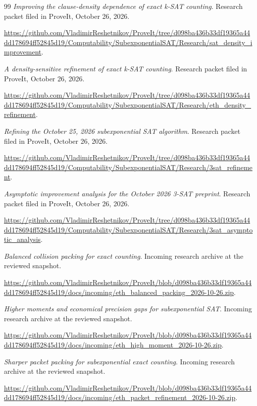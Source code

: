 \begin{thebibliography}{99}
 \emph{Improving the clause-density dependence of exact k-SAT counting}. Research packet filed in ProveIt, October 26, 2026.

\url{https://github.com/VladimirReshetnikov/ProveIt/tree/d098ba436b33df19365a44dd178694ff52845d19/Computability/SubexponentialSAT/Research/sat_density_improvement}.

 \emph{A density-sensitive refinement of exact k-SAT counting}. Research packet filed in ProveIt, October 26, 2026.

\url{https://github.com/VladimirReshetnikov/ProveIt/tree/d098ba436b33df19365a44dd178694ff52845d19/Computability/SubexponentialSAT/Research/eth_density_refinement}.

 \emph{Refining the October 25, 2026 subexponential SAT algorithm}. Research packet filed in ProveIt, October 26, 2026.

\url{https://github.com/VladimirReshetnikov/ProveIt/tree/d098ba436b33df19365a44dd178694ff52845d19/Computability/SubexponentialSAT/Research/3sat_refinement}.

 \emph{Asymptotic improvement analysis for the October 2026 3-SAT preprint}. Research packet filed in ProveIt, October 26, 2026.

\url{https://github.com/VladimirReshetnikov/ProveIt/tree/d098ba436b33df19365a44dd178694ff52845d19/Computability/SubexponentialSAT/Research/3sat_asymptotic_analysis}.

 \emph{Balanced collision packing for exact counting}. Incoming research archive at the reviewed snapshot.

\url{https://github.com/VladimirReshetnikov/ProveIt/blob/d098ba436b33df19365a44dd178694ff52845d19/docs/incoming/eth_balanced_packing_2026-10-26.zip}.

 \emph{Higher moments and economical precision gaps for subexponential SAT}. Incoming research archive at the reviewed snapshot.

\url{https://github.com/VladimirReshetnikov/ProveIt/blob/d098ba436b33df19365a44dd178694ff52845d19/docs/incoming/eth_high_moment_2026-10-26.zip}.

 \emph{Sharper packet packing for subexponential exact counting}. Incoming research archive at the reviewed snapshot.

\url{https://github.com/VladimirReshetnikov/ProveIt/blob/d098ba436b33df19365a44dd178694ff52845d19/docs/incoming/eth_packet_refinement_2026-10-26.zip}.


\end{thebibliography}
